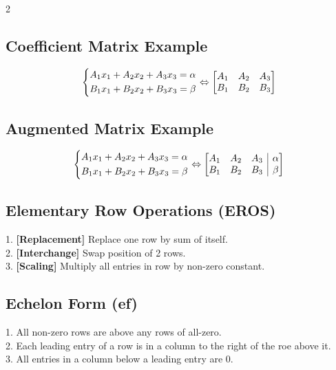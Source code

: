 \documentclass[5pt]{article}
\makeatletter
\newenvironment{amatrix}[1]{%
  \left[\begin{array}{@{}*{#1}{c}|c@{}}
}{%
  \end{array}\right]
}
\makeatother
\begin{document}
\begin{multicols}{2}
\subsection{Coefficient Matrix Example}
\small{
\begin{equation}
\centering
\left\{\begin{split}
A_1x_1+A_2x_2+A_3x_3=\alpha \\
B_1x_1+B_2x_2+B_3x_3=\beta \\
\end{split}\right.
\Leftrightarrow
\begin{bmatrix}
    A_1 & A_2 & A_3\\
    B_1 & B_2 & B_3\\
\end{bmatrix}
\end{equation}}

\subsection{Augmented Matrix Example}
\small{
\begin{equation}
\left\{\begin{split}
A_1x_1+A_2x_2+A_3x_3=\alpha \\
B_1x_1+B_2x_2+B_3x_3=\beta \\
\end{split}\right.
\Leftrightarrow
\begin{amatrix}{3}
    A_1 & A_2 & A_3 & \alpha \\
    B_1 & B_2 & B_3 & \beta \\
 \end{amatrix}
\end{equation}}

\subsection{Elementary Row Operations (EROS)}
1. \textbf{[Replacement]} Replace one row by sum of itself. \\
2. \textbf{[Interchange]} Swap position of 2 rows. \\
3. \textbf{[Scaling]} Multiply all entries in row by non-zero constant. \\


\subsection{Echelon Form (ef)}
1. All non-zero rows are above any rows of all-zero. \\
2. Each leading entry of a row is in a column to the right of the roe above it. \\
3. All entries in a column below a leading entry are 0. \\



\end{multicols}
\end{document}
